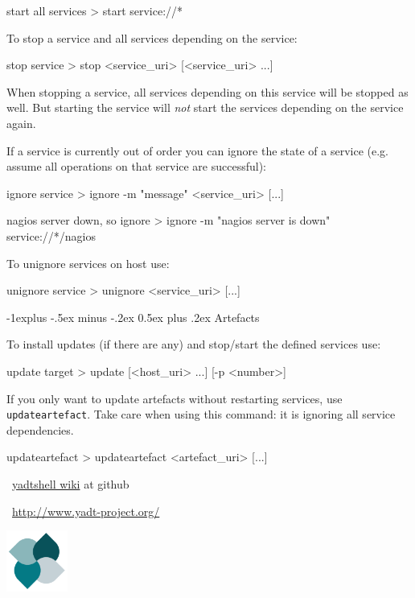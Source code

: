 \documentclass[10pt,landscape]{article}
\makeatletter
\renewcommand{\subsection}{\@startsection{subsection}{2}{0mm}%
                                {-1explus -.5ex minus -.2ex}%
                                {0.5ex plus .2ex}%
                                {\normalfont\normalsize\bfseries}}
\newcommand{\note}[2][Note]{
\begin{description}[font=\bfseries,leftmargin=1cm,style=sameline]
    \item [{#1}] {#2}
\end{description}
}
\makeatother
\begin{document}
\begin{multicols}{3}
\begin{examples}{start all services}
> start service://*
\end{examples}

To stop a service and all services depending on the service:
\begin{commands}{stop service}
> stop <service_uri> [<service_uri> ...]
\end{commands}

\note{When stopping a service, all services depending on this service will be
stopped as well. But starting the service will \emph{not} start the services
depending on the service again.}


If a service is currently out of order you can ignore the state of a service
(e.g. assume all operations on that service are successful):
\begin{commands}{ignore service}
> ignore -m "message" <service_uri> [...]
\end{commands}

\begin{examples}{nagios server down, so ignore}
> ignore -m "nagios server is down" service://*/nagios
\end{examples}

To unignore services on host use:
\begin{commands}{unignore service}
> unignore <service_uri> [...]
\end{commands}



\subsection{Artefacts}

To install updates (if there are any) and stop/start the defined services use:
\begin{commands}{update target}
> update [<host_uri> ...] [-p <number>]
\end{commands}


If you only want to update artefacts without restarting services,
use \verb+updateartefact+. Take care when using this command:
it is ignoring all service dependencies.
\begin{commands}{updateartefact}
> updateartefact <artefact_uri> [...]
\end{commands}



\begin{minipage}[b]{5cm}
~\hfill\href{https://github.com/yadt/yadtshell/wiki}{yadtshell wiki} at github

~\hfill\href{http://www.yadt-project.org/}{http://www.yadt-project.org/}
\end{minipage}%
\hfill%
\includegraphics[width=2cm,valign=b]{res/yadtlogo}%

\end{multicols}
\end{document}

